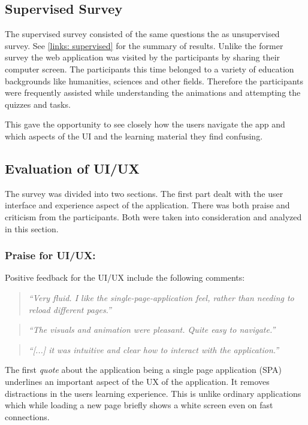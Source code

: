 \subsection{Supervised Survey}
The supervised survey consisted of the same questions the as unsupervised
survey. See \autoref{links: supervised} for the summary of results. Unlike the
former survey the web application was visited by the participants by sharing
their computer screen. The participants  this time belonged
to a variety of education backgrounds like humanities, sciences and other
fields. Therefore the participants were frequently assisted while understanding
the animations and attempting the quizzes and tasks.

This gave the opportunity to see closely how the users navigate the app and
which aspects of the UI and the learning material they find confusing.


\subsection{Evaluation of UI/UX}
The survey was divided into two sections. The first part dealt with the user interface
and experience aspect of the application. There was both praise and criticism
from the participants. Both were taken into consideration and analyzed
in this section.

\subsubsection{Praise for UI/UX:}
Positive feedback for the UI/UX include the following comments:

\begin{quote}
\emph{``Very fluid. I like the single-page-application feel, rather than
needing to reload different pages.''}
\end{quote}

\vspace{0.06 in}
\begin{quote}
\emph{``The visuals and animation were pleasant. Quite easy to navigate.''}
\end{quote}

\vspace{0.06 in}
\begin{quote}
\emph{``[...] it was intuitive and clear how to
interact with the application.''}
\end{quote}


The first \emph{quote} about the application being a single page application
(SPA) underlines an important aspect of the UX of the application.  It removes
distractions in the users learning experience. This is unlike ordinary
applications which while loading a new page briefly shows a white screen even
on fast connections.


